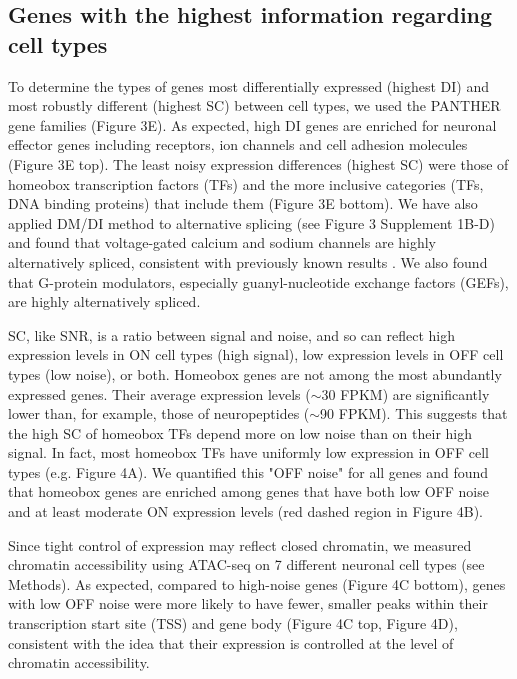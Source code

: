 \subsection{Genes with the highest information regarding cell types}

To determine the types of genes most differentially expressed (highest DI) and most robustly different (highest SC) between cell types, we used the PANTHER \citep{Thomas_2003} gene families (Figure 3E). As expected, high DI genes are enriched for neuronal effector genes including receptors, ion channels and cell adhesion molecules (Figure 3E top). The least noisy expression differences (highest SC) were those of homeobox transcription factors (TFs) and the more inclusive categories (TFs, DNA binding proteins) that include them (Figure 3E bottom). We have also applied DM/DI method to alternative splicing (see Figure 3 Supplement 1B-D) and found that voltage-gated calcium and sodium channels are highly alternatively spliced, consistent with previously known results \citep[e.g.][]{Lipscombe_2013}. We also found that G-protein modulators, especially guanyl-nucleotide exchange factors (GEFs), are highly alternatively spliced. 

SC, like SNR, is a ratio between signal and noise, and so can reflect high expression levels in ON cell types (high signal), low expression levels in OFF cell types (low noise), or both. Homeobox genes are not among the most abundantly expressed genes. Their average expression levels ($\sim$30 FPKM) are significantly lower than, for example, those of neuropeptides ($\sim$90 FPKM). This suggests that the high SC of homeobox TFs depend more on low noise than on their high signal. In fact, most homeobox TFs have uniformly low expression in OFF cell types (e.g. Figure 4A). We quantified this "OFF noise" for all genes and found that homeobox genes are enriched among genes that have both low OFF noise and at least moderate ON expression levels (red dashed region in Figure 4B).

Since tight control of expression may reflect closed chromatin, we measured chromatin accessibility using ATAC-seq \citep{Buenrostro_2013} on 7 different neuronal cell types (see Methods). As expected, compared to high-noise genes (Figure 4C bottom), genes with low OFF noise were more likely to have fewer, smaller peaks within their transcription start site (TSS) and gene body (Figure 4C top, Figure 4D), consistent with the idea that their expression is controlled at the level of chromatin accessibility.

